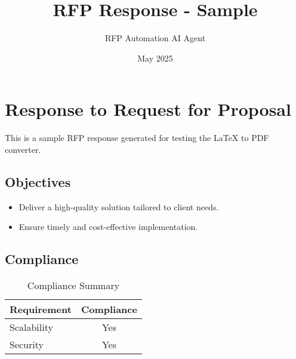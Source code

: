 \documentclass{article}
\title{RFP Response - Sample}
\author{RFP Automation AI Agent}
\date{May 2025}
\begin{document}
\maketitle

\section*{Response to Request for Proposal}

This is a sample RFP response generated for testing the LaTeX to PDF converter.

\subsection*{Objectives}
\begin{itemize}
    \item Deliver a high-quality solution tailored to client needs.
    \item Ensure timely and cost-effective implementation.
\end{itemize}

\subsection*{Compliance}
\begin{table}[h]
    \centering
    \begin{tabular}{l c}
        \toprule
        \textbf{Requirement} & \textbf{Compliance} \\
        \midrule
        Scalability & Yes \\
        Security & Yes \\
        \bottomrule
    \end{tabular}
    \caption{Compliance Summary}
\end{table}
\end{document}
